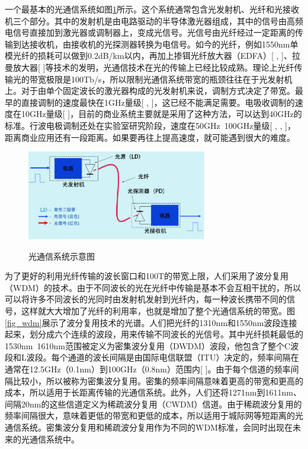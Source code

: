 \documentclass{ZJUthesis}
\begin{document}
一个最基本的光通信系统如图\ref{fig_system}所示。这个系统通常包含光发射机、光纤和光接收机三个部分。其中的发射机是由电路驱动的半导体激光器组成，其中的信号由高频电信号直接加到激光器或调制器上，变成光信号。光信号由光纤经过一定距离的传输到达接收机，由接收机的光探测器转换为电信号。如今的光纤，例如1550nm单模光纤的损耗可以做到0.2dB/km以内，再加上掺铒光纤放大器（EDFA）[ , ]、拉曼放大器[ ]等技术的发明，光通信技术在光的传输上已经比较成熟。理论上光纤传输光的带宽极限是100Tb/s，所以限制光通信系统带宽的瓶颈往往在于光发射机上。对于由单个固定波长的激光器构成的光发射机来说，调制方式决定了带宽。最早的直接调制的速度最快在1GHz量级[ , ]，这已经不能满足需要。电吸收调制的速度在10GHz量级[ ]，目前的商业系统主要就是采用了这种方法，可以达到40GHz的标准。行波电极调制还处在实验室研究阶段，速度在50GHz~100GHz量级[ , , ]，距离商业应用还有一段距离。如果要再往上提高速度，就可能遇到很大的难度。

\begin{figure}[!ht]
  \centering
  \includegraphics[width=0.7\textwidth]{./Pictures/system.eps}\\
  \caption{光通信系统示意图}
  \label{fig_system}
\end{figure}

为了更好的利用光纤传输的波长窗口和100T的带宽上限，人们采用了波分复用（WDM）的技术。由于不同波长的光在光纤中传输是基本不会互相干扰的，所以可以将许多不同波长的光同时由发射机发射到光纤内，每一种波长携带不同的信号，这样就大大增加了光纤的利用率，也就是增加了整个光通信系统的带宽。图\ref{fig_wdm}展示了波分复用技术的光谱。人们把光纤的1310nm和1550nm波段连接起来，划分成六个连续的波段，用来传输不同波长的光信号。其中光纤损耗最低的1530nm~1610nm范围被定义为密集波分复用（DWDM）波段，他包含了整个C波段和L波段。每个通道的波长间隔是由国际电信联盟（ITU）决定的，频率间隔在通常在12.5GHz（0.1nm）到100GHz（0.8nm）范围内[ ]。由于每个信道的频率间隔比较小，所以被称为密集波分复用。密集的频率间隔意味着更高的带宽和更高的成本，所以适用于长距离传输的光通信系统。此外，人们还将1271nm到1611nm、间隔20nm的这些信道定义为稀疏波分复用（CWDM）信道。由于稀疏波分复用的频率间隔很大，意味着更低的带宽和更低的成本，所以适用于城际网等短距离的光通信系统。密集波分复用和稀疏波分复用作为不同的WDM标准，会同时出现在未来的光通信系统中。
\end{document}
